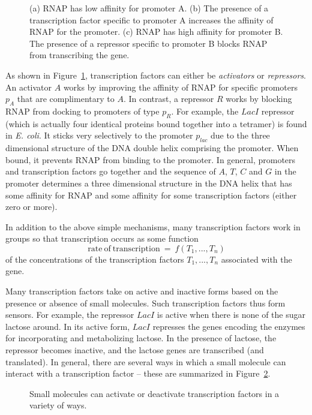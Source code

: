 \begin{figure}
\centering
{}
\caption{\label{fig:regulation}
  (a) RNAP has low affinity for promoter A. (b) The presence of a
  transcription factor specific to promoter A increases the affinity
  of RNAP for the promoter. (c) RNAP has high affinity for promoter
  B. The presence of a repressor specific to promoter B blocks RNAP
  from transcribing the gene.} 
\end{figure}

As shown in Figure~\ref{fig:regulation}, transcription factors can
either be {\em activators} or {\em repressors}. An activator $A$ works
by improving the affinity of RNAP for specific promoters $p_A$ that
are complimentary to $A$. In contrast, a repressor $R$ works by
blocking RNAP from docking to promoters of type $p_R$. For example,
the $LacI$ repressor (which is actually four identical proteins bound
together into a tetramer) is found in {\em E. coli}. It sticks very
selectively to the promoter $p_\mathit{lac}$ due to the three
dimensional structure of the DNA double helix comprising the
promoter. When bound, it prevents RNAP from binding to the
promoter. In general, promoters and transcription factors go together
and the sequence of $A$, $T$, $C$ and $G$ in the promoter determines a
three dimensional structure in the DNA helix that has some affinity
for RNAP and some affinity for some transcription factors (either zero
or more).

In addition to the above simple mechanisms, many transcription factors
work in groups so that transcription occurs as some function
%
$$
  \mathrm{rate\ of\ transcription}\ = \ f(T_1, ..., T_n) 
$$
%
of the concentrations of the transcription factors $T_1, ..., T_n$
associated with the gene. 

Many transcription factors take on active and inactive forms based on
the presence or absence of small molecules. Such transcription factors
thus form sensors. For example, the repressor $LacI$ is active when
there is none of the sugar lactose around. In its active form, $LacI$
represses the genes encoding the enzymes for incorporating and
metabolizing lactose. In the presence of lactose, the repressor
becomes inactive, and the lactose genes are transcribed (and
translated). In general, there are several ways in which a small
molecule can interact with a transcription factor -- these are
summarized in Figure~\ref{fig:trans-small}.

\begin{figure}
\centering
{}
\caption{\label{fig:trans-small}
  Small molecules can activate or deactivate transcription factors in
  a variety of ways. }
\end{figure}

